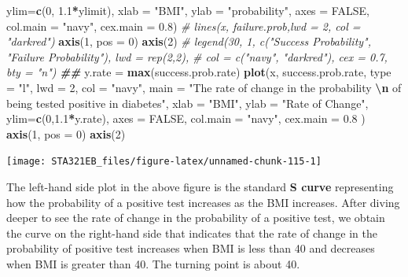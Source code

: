 \documentclass[
]{book}
\newenvironment{Shaded}{\begin{snugshade}}{\end{snugshade}}
\newcommand{\AttributeTok}[1]{\textcolor[rgb]{0.13,0.29,0.53}{#1}}
\newcommand{\CommentTok}[1]{\textcolor[rgb]{0.56,0.35,0.01}{\textit{#1}}}
\newcommand{\ConstantTok}[1]{\textcolor[rgb]{0.56,0.35,0.01}{#1}}
\newcommand{\DecValTok}[1]{\textcolor[rgb]{0.00,0.00,0.81}{#1}}
\newcommand{\DocumentationTok}[1]{\textcolor[rgb]{0.56,0.35,0.01}{\textbf{\textit{#1}}}}
\newcommand{\FloatTok}[1]{\textcolor[rgb]{0.00,0.00,0.81}{#1}}
\newcommand{\FunctionTok}[1]{\textcolor[rgb]{0.13,0.29,0.53}{\textbf{#1}}}
\newcommand{\NormalTok}[1]{#1}
\newcommand{\OtherTok}[1]{\textcolor[rgb]{0.56,0.35,0.01}{#1}}
\newcommand{\SpecialCharTok}[1]{\textcolor[rgb]{0.81,0.36,0.00}{\textbf{#1}}}
\newcommand{\StringTok}[1]{\textcolor[rgb]{0.31,0.60,0.02}{#1}}
\begin{document}
\begin{Shaded}
\begin{Highlighting}[]
     \AttributeTok{ylim=}\FunctionTok{c}\NormalTok{(}\DecValTok{0}\NormalTok{, }\FloatTok{1.1}\SpecialCharTok{*}\NormalTok{ylimit),}
     \AttributeTok{xlab =} \StringTok{"BMI"}\NormalTok{,}
     \AttributeTok{ylab =} \StringTok{"probability"}\NormalTok{,}
     \AttributeTok{axes =} \ConstantTok{FALSE}\NormalTok{,}
     \AttributeTok{col.main =} \StringTok{"navy"}\NormalTok{,}
     \AttributeTok{cex.main =} \FloatTok{0.8}\NormalTok{)}
\CommentTok{\# lines(x, failure.prob,lwd = 2, col = "darkred")}
\FunctionTok{axis}\NormalTok{(}\DecValTok{1}\NormalTok{, }\AttributeTok{pos =} \DecValTok{0}\NormalTok{)}
\FunctionTok{axis}\NormalTok{(}\DecValTok{2}\NormalTok{)}
\CommentTok{\# legend(30, 1, c("Success Probability", "Failure Probability"), lwd = rep(2,2), }
\CommentTok{\#       col = c("navy", "darkred"), cex = 0.7, bty = "n")}
\DocumentationTok{\#\#}
\NormalTok{y.rate }\OtherTok{=} \FunctionTok{max}\NormalTok{(success.prob.rate)}
\FunctionTok{plot}\NormalTok{(x, success.prob.rate, }\AttributeTok{type =} \StringTok{"l"}\NormalTok{, }\AttributeTok{lwd =} \DecValTok{2}\NormalTok{, }\AttributeTok{col =} \StringTok{"navy"}\NormalTok{,}
     \AttributeTok{main =} \StringTok{"The rate of change in the probability }\SpecialCharTok{\textbackslash{}n}\StringTok{  of being tested positive in diabetes"}\NormalTok{, }
     \AttributeTok{xlab =} \StringTok{"BMI"}\NormalTok{,}
     \AttributeTok{ylab =} \StringTok{"Rate of Change"}\NormalTok{,}
     \AttributeTok{ylim=}\FunctionTok{c}\NormalTok{(}\DecValTok{0}\NormalTok{,}\FloatTok{1.1}\SpecialCharTok{*}\NormalTok{y.rate),}
     \AttributeTok{axes =} \ConstantTok{FALSE}\NormalTok{,}
     \AttributeTok{col.main =} \StringTok{"navy"}\NormalTok{,}
     \AttributeTok{cex.main =} \FloatTok{0.8}
\NormalTok{     )}
\FunctionTok{axis}\NormalTok{(}\DecValTok{1}\NormalTok{, }\AttributeTok{pos =} \DecValTok{0}\NormalTok{)}
\FunctionTok{axis}\NormalTok{(}\DecValTok{2}\NormalTok{)}
\end{Highlighting}
\end{Shaded}

\begin{center}\texttt{[image: STA321EB\_files/figure-latex/unnamed-chunk-115-1]} \end{center}

The left-hand side plot in the above figure is the standard \textbf{S curve} representing how the probability of a positive test increases as the BMI increases. After diving deeper to see the rate of change in the probability of a positive test, we obtain the curve on the right-hand side that indicates that the rate of change in the probability of positive test increases when BMI is less than 40 and decreases when BMI is greater than 40. The turning point is about 40.
\end{document}
